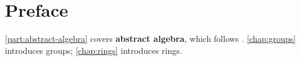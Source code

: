 \frontmatter

\section*{Preface}
\ifabsalg
\cref{part:abstract-algebra} covers \textbf{abstract algebra}, which follows \cite{dummit-foote,artin}. \cref{chap:groups} introduces groups; \cref{chap:rings} introduces rings.
\fi

